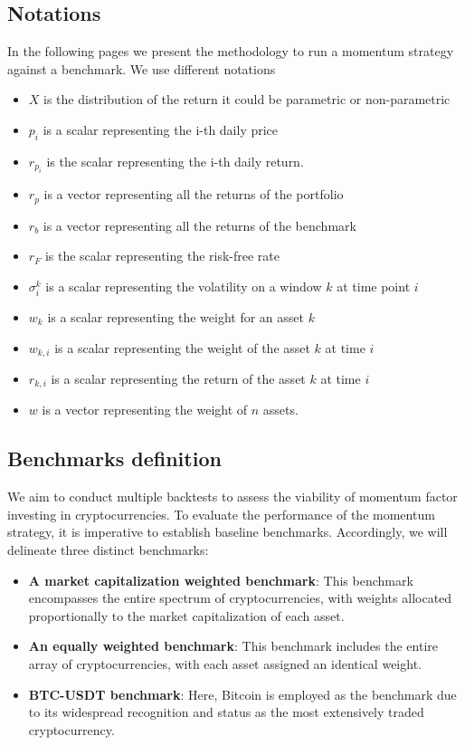 \documentclass{article}
\begin{document}
\subsection{Notations}
In the following pages we present the methodology to run a momentum strategy against a benchmark. We use different notations
\begin{itemize}
	\item $X$ is the distribution of the return it could be parametric or non-parametric
	\item $p_i$ is a scalar representing the i-th daily price
	\item $r_{p_i}$ is the scalar representing the i-th daily return.
	\item $r_p$ is a vector representing all the returns of the portfolio
	\item $r_b$ is a vector representing all the returns of the benchmark
	\item $r_F$ is the scalar representing the risk-free rate
	\item $\sigma_i^k$ is a scalar representing the volatility on a window $k$ at time point $i$
	\item $w_k$ is a scalar representing the weight for an asset $k$
	\item $w_{k,i}$ is a scalar representing the weight of the asset $k$ at time $i$
	\item $r_{k,i}$ is a scalar representing the return of the asset $k$ at time $i$
	\item $w$ is a vector representing the weight of $n$ assets.
\end{itemize}

\subsection{Benchmarks definition}
We aim to conduct multiple backtests to assess the viability of momentum factor investing in cryptocurrencies. To evaluate the performance of the momentum strategy, it is imperative to establish baseline benchmarks. Accordingly, we will delineate three distinct benchmarks:
\begin{itemize}
	\item \textbf{A market capitalization weighted benchmark}: This benchmark encompasses the entire spectrum of cryptocurrencies, with weights allocated proportionally to the market capitalization of each asset.
	\item \textbf{An equally weighted benchmark}: This benchmark includes the entire array of cryptocurrencies, with each asset assigned an identical weight.
	\item \textbf{BTC-USDT benchmark}: Here, Bitcoin is employed as the benchmark due to its widespread recognition and status as the most extensively traded cryptocurrency.
\end{itemize}
\end{document}
